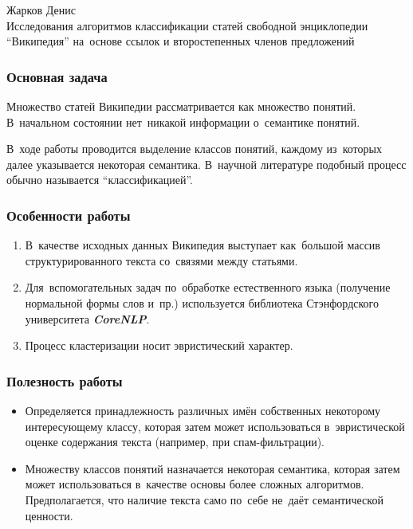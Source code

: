 \documentclass{beamer}
\newcommand{\MARK}[1]{{\bf {\it #1}}}
\begin{document}
\begin{frame}
\begin{center}
Жарков Денис\\
\vspace{1cm}
{\Large Исследования алгоритмов классификации статей свободной энциклопедии ``Википедия'' 
на~основе ссылок и второстепенных членов предложений}\\
\end{center}
\end{frame}

\begin{frame}
\frametitle{Основная задача}
Множество статей Википедии рассматривается как множество понятий.
В~начальном состоянии нет~никакой информации о~семантике понятий. 

\vspace{1cm}

В~ходе работы проводится выделение классов понятий, каждому из~которых далее указывается некоторая семантика.
В~научной литературе подобный процесс обычно называется ``классификацией''.
\end{frame}

\begin{frame}
\frametitle{Особенности работы}
\begin{enumerate}
\item {
В~качестве исходных данных Википедия выступает как~большой массив структурированного текста со~связями между статьями.
}

\item {
Для~вспомогательных задач по~обработке естественного языка (получение нормальной формы слов и~пр.) 
используется библиотека Стэнфордского университета \MARK{CoreNLP}.
}

\item{
Процесс кластеризации носит эвристический характер.
}
\end{enumerate}
\end{frame}

\begin{frame}
\frametitle{Полезность работы}

\begin{itemize}
\item {
Определяется принадлежность различных имён собственных некоторому интересующему классу,
которая затем может использоваться в~эвристической оценке содержания текста (например, при спам-фильтрации).
}

\item {
Множеству классов понятий назначается некоторая семантика, которая затем может использоваться в~качестве основы более сложных алгоритмов.
Предполагается, что наличие текста само по~себе не~даёт семантической ценности.
}
\end{itemize}

\end{frame}
\end{document}
